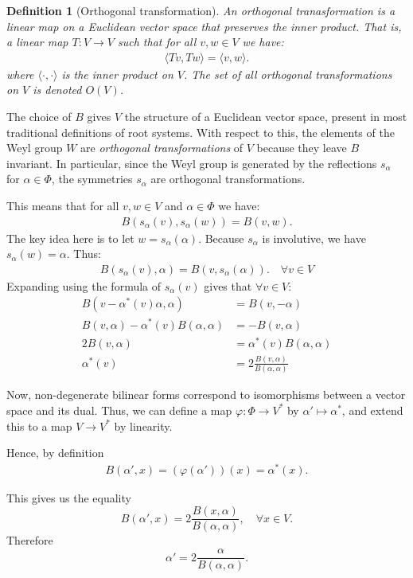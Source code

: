 \documentclass[12pt, a4paper]{article}
\newtheorem{definition}[lemma]{Definition}
\begin{document}
\begin{definition}[Orthogonal transformation]
  An \emph{orthogonal tranasformation} is a linear map on a Euclidean vector space that preserves
  the inner product. That is, a linear map $T : V \to V$ such that for all $v, w \in V$ we have:
  \begin{align*}
    \langle Tv, Tw \rangle = \langle v, w \rangle.
  \end{align*}
  where $\langle \cdot, \cdot \rangle$ is the inner product on $V$. The set of all orthogonal
  transformations on $V$ is denoted $O(V)$.
\end{definition}

The choice of $B$ gives $V$ the structure of a Euclidean vector space,
  present in most traditional definitions of root systems. With respect to this,
  the elements of the Weyl group $W$ are \emph{orthogonal transformations} of $V$
  because they leave $B$ invariant.
  In particular, since the Weyl group is generated by the reflections $s_\alpha$
  for $\alpha \in \Phi$, the symmetries $s_\alpha$ are orthogonal transformations.

  This means that for all $v, w \in V$ and $\alpha \in \Phi$ we have:
  \begin{align*}
    B(s_\alpha(v), s_\alpha(w)) = B(v, w).
  \end{align*}
  The key idea here is to let $w = s_\alpha(\alpha)$. Because $s_\alpha$ is
  involutive, we have $s_\alpha(w) = \alpha$. Thus:
  \begin{align*}
    B(s_\alpha(v), \alpha) = B(v, s_\alpha(\alpha)). \quad \forall v \in V
  \end{align*}
  Expanding using the formula of $s_\alpha(v)$ gives that $\forall v \in V$:
  \begin{align*}
    B(v - \alpha^*(v)\alpha, \alpha) &= B(v, -\alpha)  \\
    B(v, \alpha) - \alpha^*(v)B(\alpha, \alpha) &= -B(v, \alpha) \\
    2B(v, \alpha) &= \alpha^*(v)B(\alpha, \alpha) \\
    \alpha^*(v) &= 2\frac{B(v, \alpha)}{B(\alpha, \alpha)}
  \end{align*}

  Now, non-degenerate bilinear forms correspond to isomorphisms between a vector space and its
  dual. Thus, we can define a map $\varphi : \Phi \to V^*$ by $\alpha' \mapsto \alpha^*$, and extend this to
  a map $V \to V^*$ by linearity.

  Hence, by definition
  \begin{align*}
    B(\alpha', x) = (\varphi(\alpha'))(x) = \alpha^*(x).
  \end{align*}

  This gives us the equality
  \[
    B(\alpha', x) = 2\frac{B(x, \alpha)}{B(\alpha, \alpha)}, \quad \forall x \in V.
  \]
  Therefore
  \[
    \alpha' = 2\frac{\alpha}{B(\alpha, \alpha)}.
  \]



\end{document}
